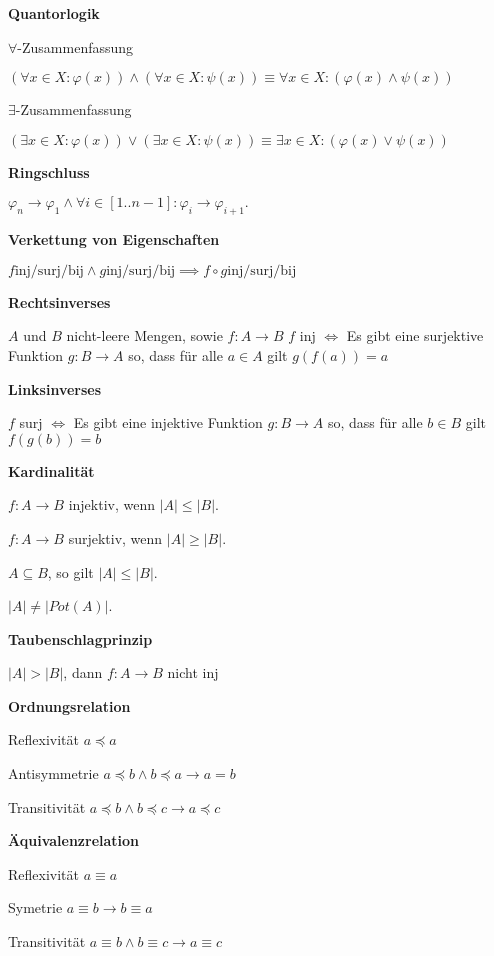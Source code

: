 \documentclass[a4paper,10pt]{article}
\begin{document}
\begin{multicols}{3}
\textbf{Quantorlogik}

$\forall$-Zusammenfassung

$(\forall x \in X: \varphi(x)) \wedge (\forall x \in X: \psi(x)) \equiv \forall x \in X: (\varphi(x) \wedge \psi(x))$

$\exists$-Zusammenfassung

$(\exists x \in X: \varphi(x)) \vee (\exists x \in X: \psi(x)) \equiv \exists x \in X: (\varphi(x) \vee \psi(x))$

\textbf{Ringschluss}

$ \varphi_{n} \rightarrow \varphi_1 \wedge \forall i \in [1..n-1]: \varphi_i \rightarrow \varphi_{i+1}. $

\textbf{Verkettung von Eigenschaften}

$f \text{inj/surj/bij} \land g \text{inj/surj/bij} \implies f\circ g\text{inj/surj/bij}$

\textbf{Rechtsinverses}

$A$ und $B$ nicht-leere Mengen, sowie $f\colon A \rightarrow B$
$f$ inj $\iff$ Es gibt eine surjektive Funktion $g\colon B \rightarrow A$ so, dass für alle $a \in A$ gilt $g(f(a))=a$

\textbf{Linksinverses}

$f$ surj $\iff$ Es gibt eine injektive Funktion $g\colon B \rightarrow A$ so, dass für alle $b \in B$ gilt $f(g(b))=b$

\textbf{Kardinalität}

$f\colon A \rightarrow B$ injektiv, wenn $|A| \leq |B|$.

$f\colon A \rightarrow B$ surjektiv, wenn $|A| \geq |B|$.

$A \subseteq B$, so gilt $|A| \leq |B|$.

$|A| \neq |Pot(A)|$.

\textbf{Taubenschlagprinzip}

$|A| > |B|$, dann $f: A \to B$ nicht inj

\textbf{Ordnungsrelation}

Reflexivität $a \preceq a$

Antisymmetrie $a \preceq b \land b \preceq a \rightarrow a=b$

Transitivität $a \preceq b \land b \preceq c \rightarrow a \preceq c$

\textbf{Äquivalenzrelation}

Reflexivität $a \equiv a$

Symetrie $a \equiv b \rightarrow b \equiv a$

Transitivität $a \equiv b \land b \equiv c \rightarrow a \equiv c$


\end{multicols}
\end{document}
